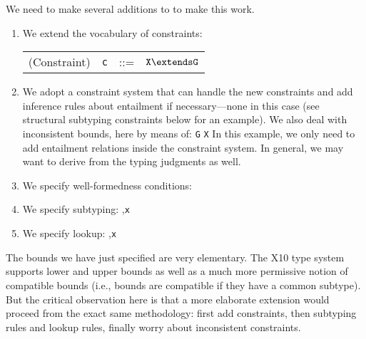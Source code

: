 We need to make several additions to \FXG to make this work.
\begin{enumerate}
\item We extend the vocabulary of constraints:
\begin{center}
\begin{tabular}{r@{\quad}rcl}
  (Constraint) & {\tt c} &{::=}& $\tt X\extends G$ \\
\end{tabular}
\end{center}
\item We adopt a constraint system that can handle the new constraints and add inference rules about entailment if necessary---none in this case (see structural subtyping constraints below for an example). We also deal with inconsistent bounds, here by means of:
\infrule
	{{\tt G}}
	{{\tt X}\vdashX\false}
In this example, we only need to add entailment relations inside the constraint system. In general, we may want to derive \false{} from the typing judgments as well.

\item We specify well-formedness conditions:
\infrule
	{ \andalso {}}
	{}
\item We specify subtyping:
	{\Gamma,{\tt x}}
\item We specify lookup:
	{\Gamma,{\tt x}}
\end{enumerate}

The bounds we have just specified are very elementary. The X10 type system supports lower and upper bounds as well as a much more permissive notion of compatible bounds (i.e., bounds are compatible if they have a common subtype). But the critical observation here is that a more elaborate extension would proceed from the exact same methodology: first add constraints, then subtyping rules and lookup rules, finally worry about inconsistent constraints.

